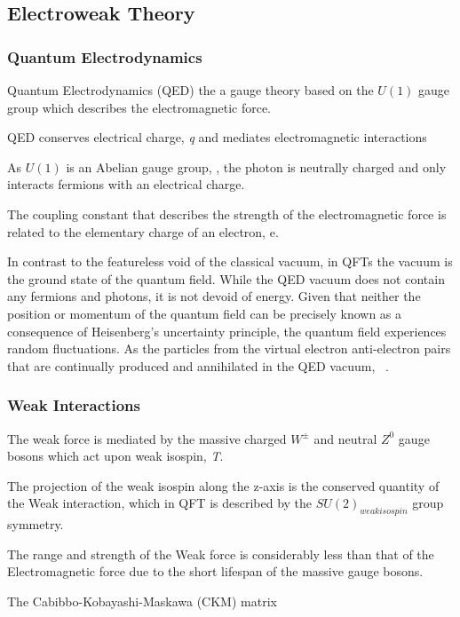 \subsection{Electroweak Theory}\label{subsec:QED}
\subsubsection{Quantum Electrodynamics}\label{subsec:QED}
Quantum Electrodynamics (QED) the a gauge theory based on the $U(1)$ gauge group which describes the electromagnetic force. 

QED conserves electrical charge, \emph{q} and mediates electromagnetic interactions 

As $U(1)$ is an Abelian gauge group, , the photon is neutrally charged and only interacts fermions with an electrical charge.

The coupling constant that describes the strength of the electromagnetic force is related to the elementary charge of an electron, e.

In contrast to the featureless void of the classical vacuum, in QFTs the vacuum is the ground state of the quantum field. 
While the QED vacuum does not contain any fermions and photons, it is not devoid of energy.
Given that neither the position or momentum of the quantum field can be precisely known as a consequence of Heisenberg's uncertainty principle, the quantum field experiences random fluctuations.
As the particles from the virtual electron anti-electron pairs 
that are continually produced and annihilated in the QED vacuum,  ~\cite{coughlan2006ideas}.

\subsubsection{Weak Interactions}\label{subsec:weakForce}
The weak force is mediated by the massive charged $W^{\pm}$ and neutral $Z^{0}$ gauge bosons which act upon weak isospin, \emph{T}.

The projection of the weak isospin along the z-axis is the conserved quantity of the Weak interaction, which in QFT is described by the $SU(2)_{weak isospin}$ group symmetry. 

The range and strength of the Weak force is considerably less than that of the Electromagnetic force due to the short lifespan of the massive gauge bosons\cite{ElectroweakStrong}. 



The Cabibbo-Kobayashi-Maskawa (CKM) matrix 

